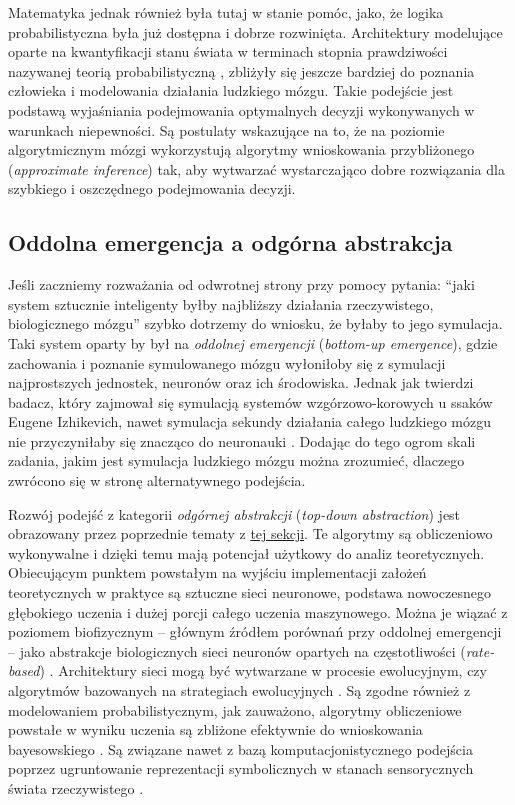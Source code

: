 Matematyka jednak również była tutaj w stanie pomóc, jako, że logika probabilistyczna była już dostępna i dobrze rozwinięta.
Architektury modelujące oparte na kwantyfikacji stanu świata w terminach stopnia prawdziwości nazywanej teorią probabilistyczną \cite{jaynes1988does}, zbliżyły się jeszcze bardziej do poznania człowieka i modelowania działania ludzkiego mózgu.
Takie podejście jest podstawą wyjaśniania podejmowania optymalnych decyzji wykonywanych w warunkach niepewności.
Są postulaty wskazujące na to, że na poziomie algorytmicznym mózgi wykorzystują algorytmy wnioskowania przybliżonego (\emph{approximate inference}) \cite{andrieu2003introduction} tak, aby wytwarzać wystarczająco dobre rozwiązania dla szybkiego i oszczędnego podejmowania decyzji.

\subsection{Oddolna emergencja a odgórna abstrakcja}

Jeśli zaczniemy rozważania od odwrotnej strony przy pomocy pytania: ``jaki system sztucznie inteligenty byłby najbliższy działania rzeczywistego, biologicznego mózgu'' szybko dotrzemy do wniosku, że byłaby to jego symulacja.
Taki system oparty by był na \emph{oddolnej emergencji} (\emph{bottom-up emergence}), gdzie zachowania i poznanie symulowanego mózgu wyłoniłoby się z symulacji najprostszych jednostek, neuronów oraz ich środowiska.
Jednak jak twierdzi badacz, który zajmował się symulacją systemów wzgórzowo-korowych u ssaków \cite{izhikevich2008large} Eugene Izhikevich, nawet symulacja sekundy działania całego ludzkiego mózgu nie przyczyniłaby się znacząco do neuronauki \cite{Izhikevich2006why}.
Dodając do tego ogrom skali zadania, jakim jest symulacja ludzkiego mózgu można zrozumieć, dlaczego zwrócono się w stronę alternatywnego podejścia.

Rozwój podejść z kategorii \emph{odgórnej abstrakcji} (\emph{top-down abstraction}) jest obrazowany przez poprzednie tematy z \hyperref[cognitive-basics]{tej sekcji}.
Te algorytmy są obliczeniowo wykonywalne i dzięki temu mają potencjał użytkowy do analiz teoretycznych.
Obiecującym punktem powstałym na wyjściu implementacji założeń teoretycznych w praktyce są sztuczne sieci neuronowe, podstawa nowoczesnego głębokiego uczenia i dużej porcji całego uczenia maszynowego.
Można je wiązać z poziomem biofizycznym -- głównym źródłem porównań przy oddolnej emergencji -- jako abstrakcje biologicznych sieci neuronów opartych na częstotliwości (\emph{rate-based}) \cite{dayan2001theoretical}.
Architektury sieci mogą być wytwarzane w procesie ewolucyjnym, czy algorytmów bazowanych na strategiach ewolucyjnych \cite{real2017large}.
Są zgodne również z modelowaniem probabilistycznym, jak zauważono, algorytmy obliczeniowe powstałe w wyniku uczenia są zbliżone efektywnie do wnioskowania bayesowskiego \cite{gal2016dropout, mandt2017stochastic}.
Są związane nawet z bazą komputacjonistycznego podejścia poprzez ugruntowanie reprezentacji symbolicznych w stanach sensorycznych świata rzeczywistego \cite{harnad1990symbol}.

